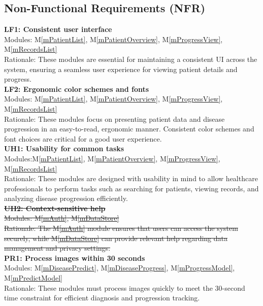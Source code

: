 \documentclass[12pt, titlepage]{article}
\newcommand{\mref}[1]{M\ref{#1}}
\begin{document}
\subsection{Non-Functional Requirements (NFR)}
\textbf{LF1: Consistent user interface} \\
Modules: \mref{mPatientList}, \mref{mPatientOverview}, \mref{mProgressView}, \mref{mRecordsList} \\
Rationale: These modules are essential for maintaining a consistent UI across the system, ensuring a seamless user experience for viewing patient details and progress. \\
\newline
\textbf{LF2: Ergonomic color schemes and fonts} \\
Modules: \mref{mPatientList}, \mref{mPatientOverview}, \mref{mProgressView}, \mref{mRecordsList} \\
Rationale: These modules focus on presenting patient data and disease progression in an easy-to-read, ergonomic manner. Consistent color schemes and font choices are critical for a good user experience. \\
\newline
\textbf{UH1: Usability for common tasks} \\
Modules:\mref{mPatientList}, \mref{mPatientOverview}, \mref{mProgressView}, \mref{mRecordsList}\\
Rationale: These modules are designed with usability in mind to allow healthcare professionals to perform tasks such as searching for patients, viewing records, and analyzing disease progression efficiently. \\
\newline
\sout{\textbf{UH2: Context-sensitive help}} \\
\sout{Modules: \mref{mAuth}, \mref{mDataStore}} \\
\sout{Rationale: The \mref{mAuth} module ensures that users can access the system securely, while \mref{mDataStore} can provide relevant help regarding data management and privacy settings.} \\
\newline
\textbf{PR1: Process images within 30 seconds} \\
Modules: \mref{mDiseasePredict}, \mref{mDiseaseProgress}, \mref{mProgressModel}, \mref{mPredictModel} \\
Rationale: These modules must process images quickly to meet the 30-second time constraint for efficient diagnosis and progression tracking. \\
\end{document}
